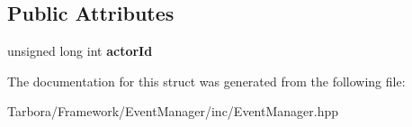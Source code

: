\subsection*{Public Attributes}
\begin{DoxyCompactItemize}
\item 
\mbox{\label{structTarbora_1_1ActorEvent_a8f46c6651eda1576e66c422c4000da83}} 
unsigned long int {\bfseries actor\+Id}
\end{DoxyCompactItemize}


The documentation for this struct was generated from the following file\+:\begin{DoxyCompactItemize}
\item 
Tarbora/\+Framework/\+Event\+Manager/inc/Event\+Manager.\+hpp\end{DoxyCompactItemize}
